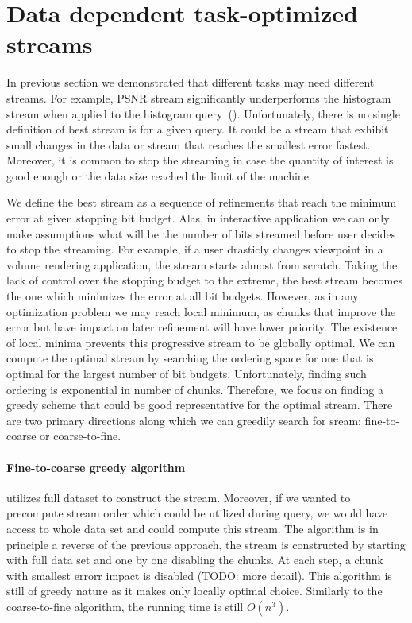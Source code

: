 \section{Data dependent task-optimized streams}
\label{sec:data_dep_streams}

In previous section we demonstrated that different tasks may need different streams. For example,
PSNR stream significantly underperforms the histogram stream when applied to the histogram
query~().
Unfortunately, there is no single definition of best stream is for a given query. It could be a stream that
exhibit small changes in the data or stream that reaches the smallest error fastest.
Moreover, it is common to stop the streaming in case the quantity of interest is good enough or the data size
reached the limit of the machine.

We define the best stream as
a sequence of refinements that reach the minimum error at given stopping bit budget. Alas, in interactive application
we can only make assumptions what will be the number of bits streamed before user decides to stop the streaming. For
example, if a user drasticly changes viewpoint in a volume rendering application, the stream starts almost from scratch.
Taking the lack of control over the stopping budget to the extreme, the best stream becomes the one which minimizes
the error at all bit budgets. However, as in any optimization problem we may reach local minimum, as
chunks that improve the error but have impact on later refinement will have lower priority. The existence of local
minima prevents this progressive stream to be globally optimal.
We can compute the optimal stream by searching the ordering space for one that is optimal for the largest number
of bit budgets. Unfortunately, finding such ordering is exponential in number of chunks. Therefore, we focus on
finding a greedy scheme that could be good representative for the optimal stream. There are two primary directions
along which we can greedily search for sream: fine-to-coarse or coarse-to-fine.

\paragraph*{Fine-to-coarse greedy algorithm} utilizes full dataset to construct the stream.
Moreover,
if we wanted to precompute stream order which could be utilized during query, we would have access to whole
data set and could compute this stream. The algorithm is in principle a reverse of the previous approach, the
stream is constructed by starting with full data set and one by one disabling the chunks. At each step, a chunk
with smallest errorr impact is disabled (TODO: more detail). This algorithm is still of greedy nature as it
makes only locally optimal choice. Similarly to the coarse-to-fine algorithm, the running time is still $O(n^3)$.

